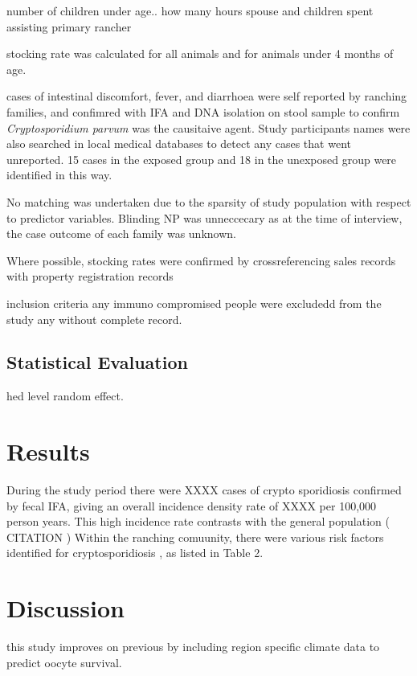 \documentclass[12pt]{article}
\begin{document}
		number of children under age..
		how many hours spouse and children spent assisting primary rancher 
		
		stocking rate was calculated for all animals and for animals under 4 months of age.	%

		cases of intestinal discomfort, fever, and diarrhoea were self reported by ranching families, and confimred with IFA and DNA isolation on stool sample to confirm \emph{Cryptosporidium parvum} was the causitaive agent.
		Study participants names were also searched in local medical databases to detect any cases that went unreported. 15 cases in the exposed group and 18 in the unexposed group were identified in this way. 
		
		No matching was undertaken due to the sparsity of study population with respect to predictor variables. Blinding NP was unneccecary as at the time of interview, the case outcome of each family was unknown.


		Where possible, stocking rates were confirmed by crossreferencing sales records with property registration records
		
		inclusion criteria
			any immuno compromised people were excludedd from the study
			any without complete record.

	\subsection{Statistical Evaluation}
		hed level random effect.

	\section{Results}
		During the study period there were XXXX cases of crypto sporidiosis confirmed by fecal IFA, giving an overall incidence density rate of XXXX per 100,000 person years. 
		This high incidence rate contrasts with the general population ( CITATION ) 
		Within the ranching comuunity, there were various risk factors identified for cryptosporidiosis , as listed in Table 2. 


	\section{Discussion} 

		this study improves on previous by including region specific climate data \cite{CIMIS} to predict oocyte survival. 
\end{document}

